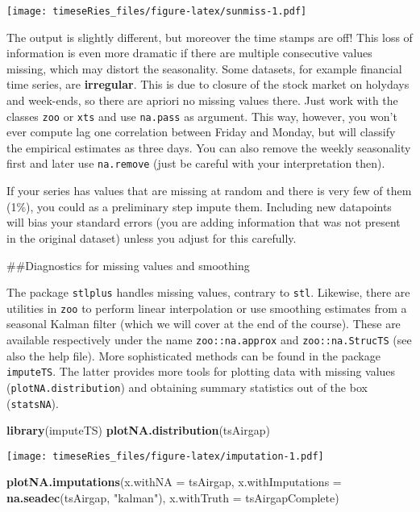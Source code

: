 \documentclass[]{book}
\newenvironment{Shaded}{\begin{snugshade}}{\end{snugshade}}
\newcommand{\DataTypeTok}[1]{\textcolor[rgb]{0.13,0.29,0.53}{#1}}
\newcommand{\KeywordTok}[1]{\textcolor[rgb]{0.13,0.29,0.53}{\textbf{#1}}}
\newcommand{\NormalTok}[1]{#1}
\newcommand{\StringTok}[1]{\textcolor[rgb]{0.31,0.60,0.02}{#1}}
\begin{document}
\texttt{[image: timeseRies\_files/figure-latex/sunmiss-1.pdf]}

The output is slightly different, but moreover the time stamps are off!
This loss of information is even more dramatic if there are multiple
consecutive values missing, which may distort the seasonality. Some
datasets, for example financial time series, are \textbf{irregular}.
This is due to closure of the stock market on holydays and week-ends, so
there are apriori no missing values there. Just work with the classes
\texttt{zoo} or \texttt{xts} and use \texttt{na.pass} as argument. This
way, however, you won't ever compute lag one correlation between Friday
and Monday, but will classify the empirical estimates as three days. You
can also remove the weekly seasonality first and later use
\texttt{na.remove} (just be careful with your interpretation then).

If your series has values that are missing at random and there is very
few of them (1\%), you could as a preliminary step impute them.
Including new datapoints will bias your standard errors (you are adding
information that was not present in the original dataset) unless you
adjust for this carefully.

\#\#Diagnostics for missing values and smoothing

The package \texttt{stlplus} handles missing values, contrary to
\texttt{stl}. Likewise, there are utilities in \texttt{zoo} to perform
linear interpolation or use smoothing estimates from a seasonal Kalman
filter (which we will cover at the end of the course). These are
available respectively under the name \texttt{zoo::na.approx} and
\texttt{zoo::na.StrucTS} (see also the help file). More sophisticated
methods can be found in the package \texttt{imputeTS}. The latter
provides more tools for plotting data with missing values
(\texttt{plotNA.distribution}) and obtaining summary statistics out of
the box (\texttt{statsNA}).

\begin{Shaded}
\begin{Highlighting}[]
\KeywordTok{library}\NormalTok{(imputeTS)}
\KeywordTok{plotNA.distribution}\NormalTok{(tsAirgap)}
\end{Highlighting}
\end{Shaded}

\texttt{[image: timeseRies\_files/figure-latex/imputation-1.pdf]}

\begin{Shaded}
\begin{Highlighting}[]
\KeywordTok{plotNA.imputations}\NormalTok{(}\DataTypeTok{x.withNA =}\NormalTok{ tsAirgap, }\DataTypeTok{x.withImputations =} \KeywordTok{na.seadec}\NormalTok{(tsAirgap, }
    \StringTok{"kalman"}\NormalTok{), }\DataTypeTok{x.withTruth =}\NormalTok{ tsAirgapComplete)}
\end{Highlighting}
\end{Shaded}
\end{document}
